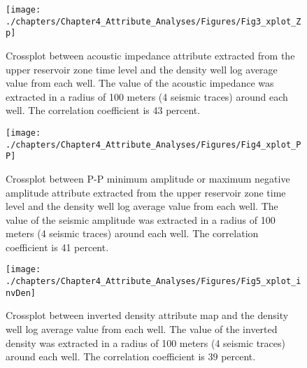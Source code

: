 	
\begin{figure}[hbtp]
	\begin{center}
	\texttt{[image: ./chapters/Chapter4\_Attribute\_Analyses/Figures/Fig3\_xplot\_Zp]}
			\caption[Crossplot between acoustic impedance attribute and density well log average value from each well.]{Crossplot between acoustic impedance attribute extracted from the upper reservoir zone time level and the density well log average value from each well. The value of the acoustic impedance was extracted in a radius of 100 meters (4 seismic traces) around each well. The correlation coefficient is 43 percent.}
			\label{fig:xplot_zp}
		\end{center}
	\end{figure}	
	
	
	
\begin{figure}[hbtp]
	\begin{center}
	\texttt{[image: ./chapters/Chapter4\_Attribute\_Analyses/Figures/Fig4\_xplot\_PP]}
			\caption[Crossplot between P-P minimum amplitude attribute and density well log average value from each well.]{Crossplot between P-P minimum amplitude or maximum negative amplitude attribute extracted from the upper reservoir zone time level and the density well log average value from each well. The value of the seismic amplitude was extracted in a radius of 100 meters (4 seismic traces) around each well. The correlation coefficient is 41 percent.}
			\label{fig:xplot_PP}
		\end{center}
	\end{figure}	


\begin{figure}[hbtp]
	\begin{center}
	\texttt{[image: ./chapters/Chapter4\_Attribute\_Analyses/Figures/Fig5\_xplot\_invDen]}
			\caption[Crossplot between inverted density attribute extracted from the upper reservoir zone time level and density well log average value from each well.]{Crossplot between inverted density attribute map and the density well log average value from each well. The value of the inverted density was extracted in a radius of 100 meters (4 seismic traces) around each well. The correlation coefficient is 39 percent.}
			\label{fig:xplot_invDen}
		\end{center}
	\end{figure}	







